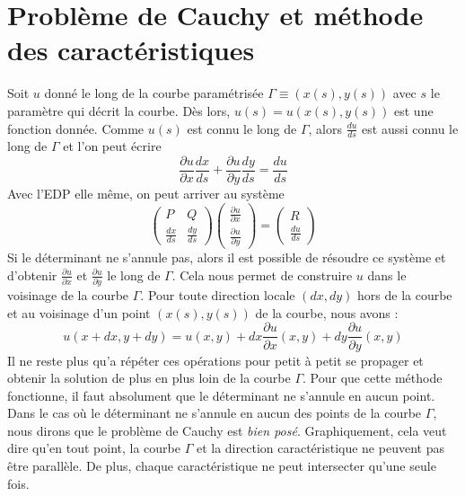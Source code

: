 \section{Problème de Cauchy et méthode des caractéristiques}
Soit $u$ donné le long de la courbe paramétrisée $\Gamma \equiv (x(s),y(s))$ avec $s$ le paramètre qui décrit la courbe. Dès lors, $u(s)=u(x(s),y(s))$ est une fonction donnée. Comme $u(s)$ est connu le long de $\Gamma$, alors $\frac{d u}{ds}$ est aussi connu le long de $\Gamma$ et l'on peut écrire
\begin{equation}
\frac{\partial u}{\partial x}\frac{d x}{d s} + \frac{\partial u}{\partial y}\frac{d y}{d s} = \frac{d u}{d s}
\end{equation}
Avec l'EDP elle même, on peut arriver au système 
\begin{equation}
\begin{pmatrix}
P & Q \\
\frac{dx}{ds} & \frac{dy}{ds}
\end{pmatrix}
%
\begin{pmatrix}
\frac{\partial u}{\partial x} \\
\frac{\partial u}{\partial y} 
\end{pmatrix}
=
\begin{pmatrix}
R \\
\frac{du}{ds}
\end{pmatrix}
\label{eq:sys-EDP-1er-ordre}
\end{equation}
Si le déterminant ne s'annule pas, alors il est possible de résoudre ce système et d'obtenir $\frac{\partial u}{\partial x}$ et $\frac{\partial u}{\partial y}$ le long de $\Gamma$. Cela nous permet de construire $u$ dans le voisinage de la courbe $\Gamma$. Pour toute direction locale $(dx,dy)$ hors de la courbe et au voisinage d'un point $(x(s),y(s))$ de la courbe, nous avons :
\begin{equation}
u(x+dx,y+dy)=u(x,y)+dx\frac{\partial u}{\partial x}(x,y) + dy \frac{\partial u}{\partial y}(x,y)
\end{equation}
Il ne reste plus qu'a répéter ces opérations pour petit à petit se propager et obtenir la solution de plus en plus loin de la courbe $\Gamma$. Pour que cette méthode fonctionne, il faut absolument que le déterminant ne s'annule en aucun point. Dans le cas où le déterminant ne s'annule en aucun des points de la courbe $\Gamma$, nous dirons que le problème de Cauchy est \emph{bien posé}. Graphiquement, cela veut dire qu'en tout point, la courbe $\Gamma$ et la direction caractéristique ne peuvent pas être parallèle. De plus, chaque caractéristique ne peut intersecter qu'une seule fois. 
